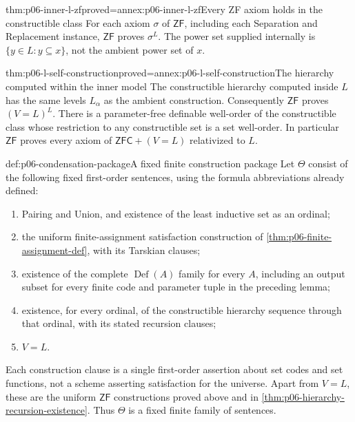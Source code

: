 \begin{hbtheorem}{thm:p06-inner-l-zf}{proved=annex:p06-inner-l-zf}{Every ZF axiom holds in the constructible class}
For each axiom \(\sigma\) of \(\mathsf{ZF}\), including each
Separation and Replacement instance,
\(\mathsf{ZF}\) proves \(\sigma^L\).
The power set supplied internally is
\(\{y\in L:y\subseteq x\}\), not the ambient power set of \(x\).
\end{hbtheorem}

\begin{hbtheorem}{thm:p06-l-self-construction}{proved=annex:p06-l-self-construction}{The hierarchy computed within the inner model}
The constructible hierarchy computed inside \(L\) has the same
levels \(L_\alpha\) as the ambient construction.
Consequently \(\mathsf{ZF}\) proves \((V=L)^L\).
There is a parameter-free definable well-order of the
constructible class whose restriction to any constructible set
is a set well-order. In particular
\(\mathsf{ZF}\) proves every axiom of
\(\mathsf{ZFC}+(V=L)\) relativized to \(L\).
\end{hbtheorem}

\begin{hbdefinition}{def:p06-condensation-package}{A fixed finite construction package}
Let \(\Theta\) consist of the following fixed first-order sentences,
using the formula abbreviations already defined:
\begin{enumerate}
 \item Pairing and Union, and existence of the least inductive set
       as an ordinal;
 \item the uniform finite-assignment satisfaction construction of
       \cref{thm:p06-finite-assignment-def}, with its Tarskian clauses;
 \item existence of the complete \(\operatorname{Def}(A)\) family
       for every \(A\), including an output subset for every
       finite code and parameter tuple in the preceding lemma;
 \item existence, for every ordinal, of the constructible hierarchy
       sequence through that ordinal, with its stated recursion clauses;
 \item \(V=L\).
\end{enumerate}
Each construction clause is a single first-order assertion about
set codes and set functions, not a scheme asserting satisfaction
for the universe. Apart from \(V=L\), these are the uniform
\(\mathsf{ZF}\) constructions proved above and in
\cref{thm:p06-hierarchy-recursion-existence}.
Thus \(\Theta\) is a fixed finite family of sentences.
\end{hbdefinition}

